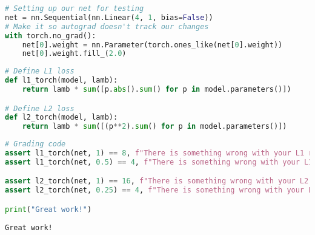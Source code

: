 \begin{lstlisting}[language=Python]
# Setting up our net for testing
net = nn.Sequential(nn.Linear(4, 1, bias=False))
# Make it so autograd doesn't track our changes
with torch.no_grad():
    net[0].weight = nn.Parameter(torch.ones_like(net[0].weight))
    net[0].weight.fill_(2.0)
\end{lstlisting}

\begin{lstlisting}[language=Python]
# Define L1 loss
def l1_torch(model, lamb):
    return lamb * sum([p.abs().sum() for p in model.parameters()])

# Define L2 loss
def l2_torch(model, lamb):
    return lamb * sum([(p**2).sum() for p in model.parameters()])
\end{lstlisting}

\begin{lstlisting}[language=Python]
# Grading code
assert l1_torch(net, 1) == 8, f"There is something wrong with your L1 regularization implementation. Expected 8, got {l1_torch(net, 1)}"
assert l1_torch(net, 0.5) == 4, f"There is something wrong with your L1 regularization implementation. Expected 4, got {l1_torch(net, 0.5)}"

assert l2_torch(net, 1) == 16, f"There is something wrong with your L2 regularization implementation. Expected 16, got {l2_torch(net, 1)}"
assert l2_torch(net, 0.25) == 4, f"There is something wrong with your L2 regularization implementation. Expected 4, got {l2_torch(net, 0.25)}"

print("Great work!")
\end{lstlisting}

\begin{lstlisting}
Great work!
\end{lstlisting}

\begin{lstlisting}[language=Python]
\end{lstlisting}


